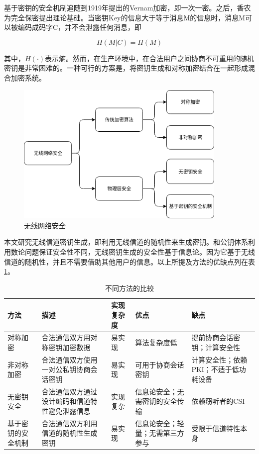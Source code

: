 \documentclass[master]{seuthesis} %
\begin{document}
\begin{Main}
基于密钥的安全机制追随到1919年提出的Vernam加密，即一次一密\cite{vernam1922secret}。之后，香农为完全保密提出理论基础\cite{shannon1949communication}。当密钥Key的信息大于等于消息M的信息时，消息M可以被编码成码字C，并不会泄露任何消息，即

\begin{equation}
    H(M|C) = H(M)
\end{equation}

其中，$H(\cdot)$表示熵。然而，在生产环境中，在合法用户之间协商不可重用的随机密钥是非常困难的。一种可行的方案是，将密钥生成和对称加密结合在一起形成混合加密系统。

\begin{figure}[htbp!]
    \centering \includegraphics[width=0.9\textwidth]{images/wireless-network-security} 
    \caption{无线网络安全}
    \label{wirelss-network-security}
\end{figure}

本文研究无线信道密钥生成，即利用无线信道的随机性来生成密钥。和公钥体系利用数论问题保证安全性不同，无线密钥生成的安全性基于信息论。因为它基于无线信道的随机性\cite{ahlswede1993common}\cite{maurer1993secret}，并且不需要借助其他用户的信息。以上所提及方法的优缺点列在表\ref{comparison-different-schemes}。

\begin{table}[]
    \begin{tabular}{|l|l|l|l|l|}
    \hline
    方法 & 描述 & 实现复杂度 & 优点 & 缺点 \\ \hline
    对称加密 & 合法通信双方用对称密钥加密数据 & 易实现 & 算法复杂度低 & 提前协商会话密钥；计算安全性 \\ \hline
    非对称加密 & 合法通信双方使用一对公私钥协商会话密钥 & 易实现 & 可用于协商会话密钥 & 计算安全性；依赖PKI；不适于低功耗设备 \\ \hline
    无密钥安全 & 合法通信双方通过设计编码和信道特性避免泄露信息 & 实现复杂 & 信息论安全；无需密钥的安全传输 & 依赖窃听者的CSI \\ \hline
    基于密钥的安全机制 & 合法通信双方利用信道的随机性生成密钥 & 易实现 & 信息论安全；轻量；无需第三方参与 & 受限于信道特性本身 \\ \hline
    \end{tabular}
    \caption{不同方法的比较
    \label{comparison-different-schemes}}
\end{table}


\end{Main}
\end{document}
